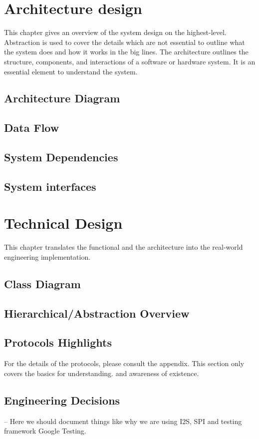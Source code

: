 \chapter{Architecture design}
\label{chapter:intro}
This chapter gives an overview of the system design on the highest-level. Abstraction is used to cover the details which are not essential to outline what the system does and how it works in the big lines. \newline
The architecture outlines the structure, components, and interactions of a software or hardware system. It is an essential element to understand the system. 

\section {Architecture Diagram}

\section {Data Flow}
\section {System Dependencies}

\section {System interfaces}

\chapter{Technical Design}
This chapter translates the functional and the architecture into the real-world engineering implementation. 
\section{Class Diagram}
\section{Hierarchical/Abstraction Overview}
\section{Protocols Highlights}
For the details of the protocols, please consult the appendix. This section only covers the basics for understanding. and awareness of existence.  
\section{Engineering Decisions}
-- Here we should document things like why we are using I2S, SPI and testing framework Google Testing. 
